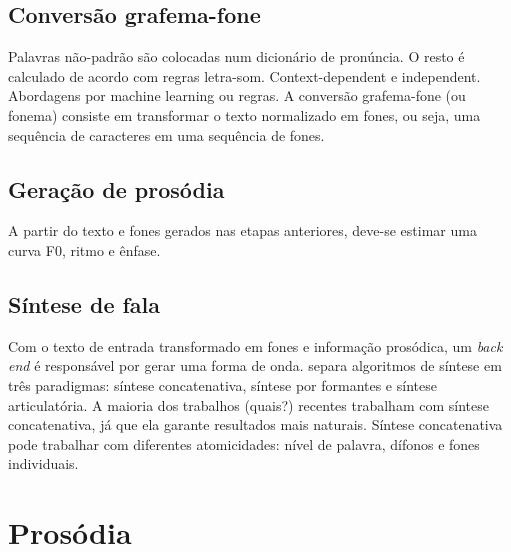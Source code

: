 \subsection{Conversão grafema-fone}
Palavras não-padrão são colocadas num dicionário de pronúncia. O resto é
calculado de acordo com regras letra-som.
Context-dependent e independent. Abordagens por machine learning ou regras.
A conversão grafema-fone (ou fonema) consiste em transformar o texto normalizado
em fones, ou seja, uma sequência de caracteres em uma sequência de fones.

\subsection{Geração de prosódia}
A partir do texto e fones gerados nas etapas anteriores, deve-se estimar uma
curva F0, ritmo e ênfase.


\subsection{Síntese de fala}
Com o texto de entrada transformado em fones e informação prosódica, um
\emph{back end} é responsável por gerar uma forma de onda.
 separa algoritmos de síntese em três paradigmas:
síntese concatenativa, síntese por formantes e síntese articulatória. A maioria
dos trabalhos (quais?) recentes trabalham com síntese concatenativa, já que ela
garante resultados mais naturais. Síntese concatenativa pode trabalhar com
diferentes atomicidades: nível de palavra, dífonos e fones individuais.

\section{Prosódia}
